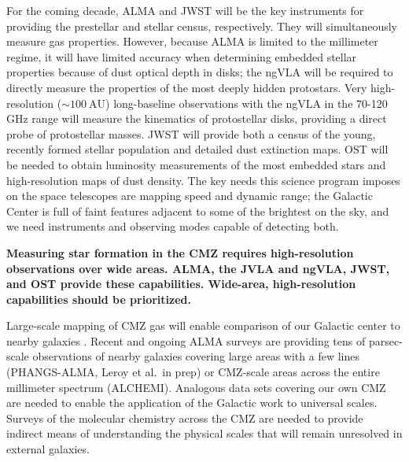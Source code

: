 \documentclass[modern]{aastex62}
\begin{document}
For the coming decade, ALMA and JWST will be the key instruments for providing
the prestellar and stellar census, respectively.  They will simultaneously measure
gas properties.  However, because ALMA is limited to the millimeter regime,
it will have limited accuracy when determining embedded stellar properties because
of dust optical depth in disks; the ngVLA will be required to directly measure
the properties of the most deeply hidden protostars.  Very high-resolution ($\sim100\mathrm{~AU}$)
long-baseline observations with the ngVLA in the 70-120 GHz range will measure
the kinematics of protostellar disks, providing a direct probe of protostellar
masses.  JWST will provide both
a census of the young, recently formed stellar population and detailed dust 
extinction maps.  OST will be needed to obtain luminosity measurements of the
most embedded stars and high-resolution maps of dust density.  The key needs
this science program imposes on the space telescopes are mapping speed
and dynamic range; the Galactic Center is full of faint features adjacent
to some of the brightest on the sky, and we need instruments and observing
modes capable of detecting both.

\textbf{Measuring star formation in the CMZ requires high-resolution
observations over wide areas.  ALMA, the JVLA and ngVLA, JWST, and OST provide
these capabilities.  Wide-area, high-resolution capabilities should be 
prioritized.
}

Large-scale mapping of CMZ gas will enable comparison of our Galactic center to
nearby galaxies \citep[e.g.,][]{Leroy2018a}.
Recent and ongoing ALMA
surveys are providing tens of parsec-scale observations of nearby galaxies
covering large areas with a few lines (PHANGS-ALMA, Leroy et al.\ in prep) or
CMZ-scale areas across the entire millimeter spectrum (ALCHEMI).  Analogous
data sets covering our own CMZ are needed to enable the application
of the Galactic work to universal scales.  Surveys of the molecular
chemistry across the CMZ are needed to provide indirect means of understanding
the physical scales that will remain unresolved in external galaxies.
\end{document}
